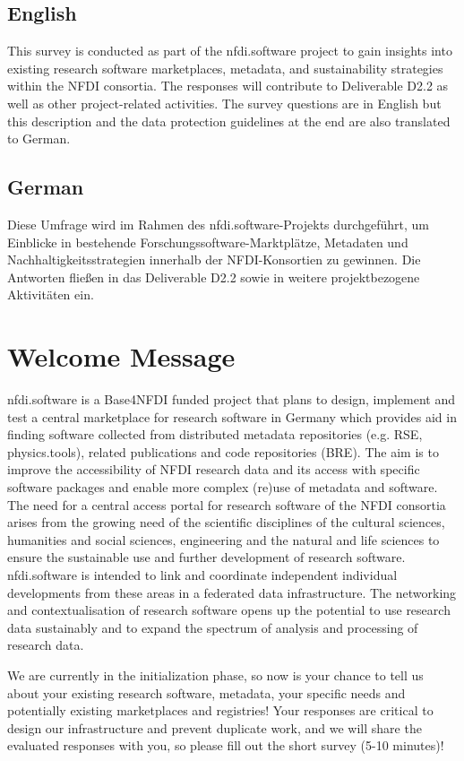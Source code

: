 \documentclass[headsepline,titlepage,twoside,12pt,toc=flat,headings=normal]{scrreprt}
\begin{document}
\subsection{English}
This survey is conducted as part of the nfdi.software project to gain insights into existing research software marketplaces, metadata, and sustainability strategies within the NFDI consortia.
The responses will contribute to Deliverable D2.2 as well as other project-related activities.
The survey questions are in English but this description and the data protection guidelines at the end are also translated to German.

\subsection{German}
Diese Umfrage wird im Rahmen des nfdi.software-Projekts durchgeführt, um Einblicke in bestehende Forschungssoftware-Marktplätze, Metadaten und Nachhaltigkeitsstrategien innerhalb der NFDI-Konsortien zu gewinnen.
Die Antworten fließen in das Deliverable D2.2 sowie in weitere projektbezogene Aktivitäten ein.

\section{Welcome Message}
nfdi.software is a Base4NFDI funded project that plans to design, implement and test a central marketplace for research software in Germany which provides aid in finding software collected from distributed metadata repositories (e.g. RSE, physics.tools), related publications and code repositories (BRE).
The aim is to improve the accessibility of NFDI research data and its access with specific software packages and enable more complex (re)use of metadata and software.
The need for a central access portal for research software of the NFDI consortia arises from the growing need of the scientific disciplines of the cultural sciences, humanities and social sciences, engineering and the natural and life sciences to ensure the sustainable use and further development of research software.
nfdi.software is intended to link and coordinate independent individual developments from these areas in a federated data infrastructure.
The networking and contextualisation of research software opens up the potential to use research data sustainably and to expand the spectrum of analysis and processing of research data.

We are currently in the initialization phase, so now is your chance to tell us about your existing research software, metadata, your specific needs and potentially existing marketplaces and registries!
Your responses are critical to design our infrastructure and prevent duplicate work, and we will share the evaluated responses with you, so please fill out the short survey (5-10 minutes)!
\end{document}
